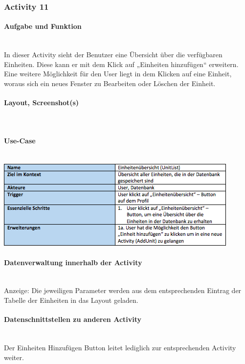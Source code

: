 \subsubsection{Activity 11}

\paragraph{Aufgabe und Funktion}\\
In dieser Activity sieht der Benutzer eine Übersicht über die verfügbaren Einheiten. Diese kann er mit dem Klick auf „Einheiten hinzufügen“ erweitern. Eine weitere Möglichkeit für den User liegt in dem Klicken auf eine Einheit, woraus sich ein neues Fenster zu Bearbeiten oder Löschen der Einheit.

\paragraph{Layout, Screenshot(s)}\\
\paragraph{Use-Case}$~~$\\
\newline
\includegraphics[scale=1]{img/usecaseunitlist}\\
\paragraph{Datenverwaltung innerhalb der Activity}\\
Anzeige: Die jeweiligen Parameter werden aus dem entsprechenden Eintrag der Tabelle der Einheiten in das Layout geladen. 

\paragraph{Datenschnittstellen zu anderen Activity}\\
Der Einheiten Hinzufügen Button leitet lediglich zur entsprechenden Activity weiter.

